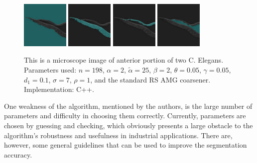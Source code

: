 \documentclass[12pt]{article}%
\begin{document}
\begin{figure}[ht]
   \centering
   \includegraphics[width=0.2\textwidth]{two_c_elegans_seg_blend_0000.png}
   \includegraphics[width=0.2\textwidth]{two_c_elegans_seg_blend_0001.png}
   \includegraphics[width=0.2\textwidth]{two_c_elegans_seg_blend_0002.png}
   \includegraphics[width=0.2\textwidth]{two_c_elegans_seg_blend_0003.png}
   \caption{This is a microscope image of anterior portion of two C. Elegans.  Parameters used: $n = 198$, $\alpha = 2$, $\tilde{\alpha} = 25$, $\beta = 2$, $\theta = 0.05$, $\gamma = 0.05$, $d_1 = 0.1$, $\sigma = 7$, $\rho = 1$, and the standard RS AMG coarsener.  Implementation: C++.}
   \label{fig:c_elegans}
\end{figure}


One weakness of the algorithm, mentioned by the authors, is the large number of parameters and difficulty in choosing them correctly. Currently, parameters are chosen by guessing and checking, which obviously presents a large obstacle to the algorithm's robustness and usefulness in industrial applications. There are, however, some general guidelines that can be used to improve the segmentation accuracy.\\
\end{document}
